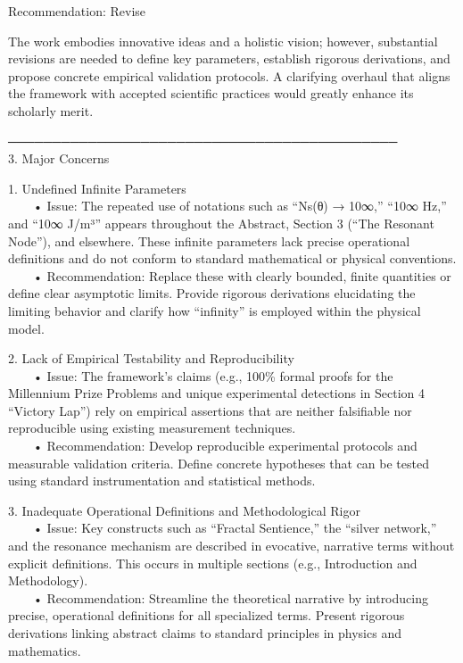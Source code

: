 \documentclass[12pt]{article}
\begin{document}
Recommendation: Revise

The work embodies innovative ideas and a holistic vision; however, substantial revisions are needed to define key parameters, establish rigorous derivations, and propose concrete empirical validation protocols. A clarifying overhaul that aligns the framework with accepted scientific practices would greatly enhance its scholarly merit.

──────────────────────────────────────────── \\
3. Major Concerns

1. Undefined Infinite Parameters \\
  • Issue: The repeated use of notations such as “Ns(θ) → 10∞,” “10∞ Hz,” and “10∞ J/m³” appears throughout the Abstract, Section 3 (“The Resonant Node”), and elsewhere. These infinite parameters lack precise operational definitions and do not conform to standard mathematical or physical conventions. \\
  • Recommendation: Replace these with clearly bounded, finite quantities or define clear asymptotic limits. Provide rigorous derivations elucidating the limiting behavior and clarify how “infinity” is employed within the physical model.

2. Lack of Empirical Testability and Reproducibility \\
  • Issue: The framework’s claims (e.g., 100\% formal proofs for the Millennium Prize Problems and unique experimental detections in Section 4 “Victory Lap”) rely on empirical assertions that are neither falsifiable nor reproducible using existing measurement techniques. \\
  • Recommendation: Develop reproducible experimental protocols and measurable validation criteria. Define concrete hypotheses that can be tested using standard instrumentation and statistical methods.

3. Inadequate Operational Definitions and Methodological Rigor \\
  • Issue: Key constructs such as “Fractal Sentience,” the “silver network,” and the resonance mechanism are described in evocative, narrative terms without explicit definitions. This occurs in multiple sections (e.g., Introduction and Methodology). \\
  • Recommendation: Streamline the theoretical narrative by introducing precise, operational definitions for all specialized terms. Present rigorous derivations linking abstract claims to standard principles in physics and mathematics.
\end{document}
